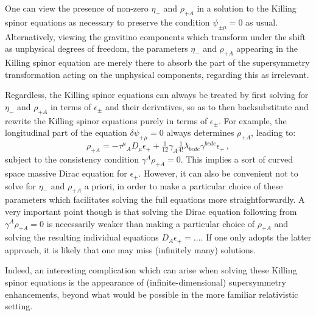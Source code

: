 \documentclass[11pt]{article}
\newcommand{\be}{\begin{equation}}
\newcommand{\ee}{\end{equation}}
\numberwithin{equation}{section}
\begin{document}
{{One can view the presence of non-zero $\eta_-$ and $\rho_{+A}$ in a solution to the Killing spinor equations as necessary to preserve the condition $\psi_{\pm \mu} = 0$ as usual.
Alternatively, viewing the gravitino components which transform under the shift as unphysical degrees of freedom, the parameters $\eta_-$ and $\rho_{+A}$ appearing in the Killing spinor equation are merely there to absorb the part of the supersymmetry transformation acting on the unphysical components, regarding this as irrelevant.  

Regardless, the Killing spinor equations can always be treated by first solving for $\eta_-$ and $\rho_{+A}$ in terms of $\epsilon_\pm$ and their derivatives, so as to then backsubstitute and rewrite the Killing spinor equations purely in terms of $\epsilon_\pm$. 
For example, the longitudinal part of the equation $\delta \psi_{+\mu} = 0$ always determines $\rho_{+A}$, leading to:
\be
\rho_{+A} = - \tau^\mu{}_A D_\mu \epsilon_+ + \tfrac{1}{12} \gamma_A \tfrac{1}{4!} \lambda_{bcde} \gamma^{bcde} \epsilon_+ \,, 
\ee
subject to the consistency condition $\gamma^A \rho_{+A} = 0$.
This implies a sort of curved space massive Dirac equation for $\epsilon_+$.
However, it can also be convenient not to solve for $\eta_-$ and $\rho_{+A}$ a priori, in order to make a particular choice of these parameters which facilitates solving the full equations more straightforwardly.
A very important point though is that solving the Dirac equation following from $\gamma^A \rho_{+A} = 0$ is necessarily weaker than making a particular choice of $\rho_{+A}$ and solving the resulting individual equations $D_{A} \epsilon_+ = \dots$. If one only adopts the latter approach, it is likely that one may miss (infinitely many) solutions.

Indeed, an interesting complication which can arise when solving these Killing spinor equations is the appearance of (infinite-dimensional) supersymmetry enhancements, beyond what would be possible in the more familiar relativistic setting.

}}
\end{document}
